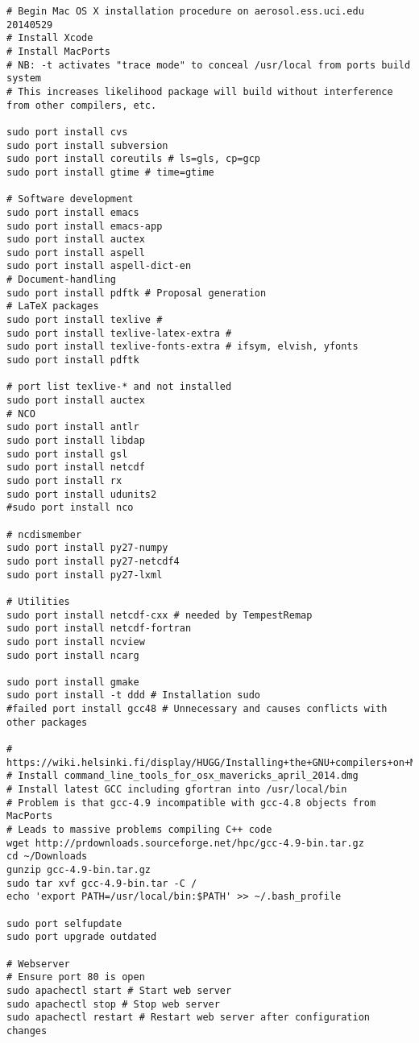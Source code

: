 \documentclass[12pt,twoside]{article}
\begin{document}
\begin{verbatim}
# Begin Mac OS X installation procedure on aerosol.ess.uci.edu 20140529
# Install Xcode
# Install MacPorts
# NB: -t activates "trace mode" to conceal /usr/local from ports build system
# This increases likelihood package will build without interference from other compilers, etc.

sudo port install cvs
sudo port install subversion
sudo port install coreutils # ls=gls, cp=gcp
sudo port install gtime # time=gtime

# Software development
sudo port install emacs
sudo port install emacs-app
sudo port install auctex
sudo port install aspell
sudo port install aspell-dict-en
# Document-handling
sudo port install pdftk # Proposal generation
# LaTeX packages
sudo port install texlive # 
sudo port install texlive-latex-extra # 
sudo port install texlive-fonts-extra # ifsym, elvish, yfonts
sudo port install pdftk

# port list texlive-* and not installed
sudo port install auctex
# NCO
sudo port install antlr
sudo port install libdap
sudo port install gsl
sudo port install netcdf
sudo port install rx
sudo port install udunits2
#sudo port install nco

# ncdismember
sudo port install py27-numpy
sudo port install py27-netcdf4
sudo port install py27-lxml

# Utilities
sudo port install netcdf-cxx # needed by TempestRemap
sudo port install netcdf-fortran
sudo port install ncview
sudo port install ncarg

sudo port install gmake
sudo port install -t ddd # Installation sudo
#failed port install gcc48 # Unnecessary and causes conflicts with other packages

# https://wiki.helsinki.fi/display/HUGG/Installing+the+GNU+compilers+on+Mac+OS+X
# Install command_line_tools_for_osx_mavericks_april_2014.dmg
# Install latest GCC including gfortran into /usr/local/bin
# Problem is that gcc-4.9 incompatible with gcc-4.8 objects from MacPorts
# Leads to massive problems compiling C++ code
wget http://prdownloads.sourceforge.net/hpc/gcc-4.9-bin.tar.gz
cd ~/Downloads
gunzip gcc-4.9-bin.tar.gz
sudo tar xvf gcc-4.9-bin.tar -C /
echo 'export PATH=/usr/local/bin:$PATH' >> ~/.bash_profile

sudo port selfupdate
sudo port upgrade outdated

# Webserver
# Ensure port 80 is open
sudo apachectl start # Start web server
sudo apachectl stop # Stop web server
sudo apachectl restart # Restart web server after configuration changes
\end{verbatim}
\end{document}

